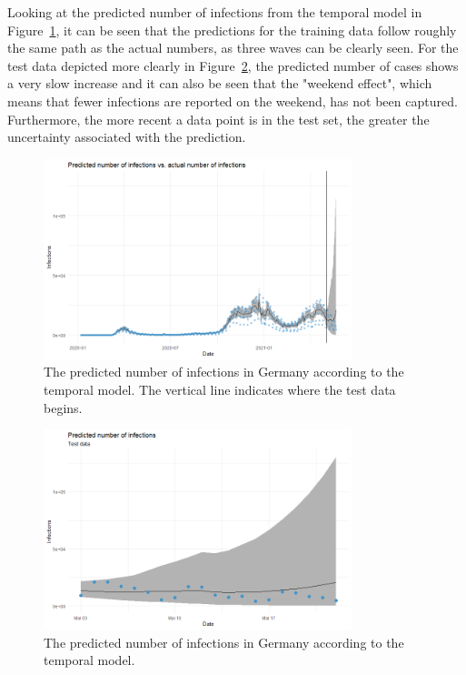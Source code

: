 Looking at the predicted number of infections from the temporal model in Figure~\ref{predictions_1_germany}, it can be seen that the predictions for the training data follow roughly the same path as the actual numbers, as three waves can be clearly seen. For the test data depicted more clearly in Figure~\ref{predictions_2_germany}, the predicted number of cases shows a very slow increase and it can also be seen that the "weekend effect", which means that fewer infections are reported on the weekend, has not been captured. Furthermore, the more recent a data point is in the test set, the greater the uncertainty associated with the prediction.
\begin{figure}[H]
  \centering
  \includegraphics[width = 0.8\textwidth]{predictions_1_germany.png}
  \caption{The predicted number of infections in Germany according to the temporal model. The vertical line indicates where the test data begins.}
  \label{predictions_1_germany}
\end{figure}
\begin{figure}[H]
  \centering
  \includegraphics[width = 0.8\textwidth]{predictions_2_germany.png}
  \caption{The predicted number of infections in Germany according to the temporal model.}
  \label{predictions_2_germany}
\end{figure}
